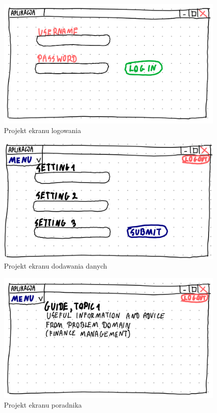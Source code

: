 \documentclass[a4paper,10pt, twoside]{report}
\begin{document}
\begin{large}
\begin{figure}[H]           %
    \centering
    \includegraphics[width=12cm]{figures/Righten_UI_sketch_loginscreen.png}
    \caption{Projekt ekranu logowania}
    \label{fig:uiprojectlogin}
\end{figure}

\begin{figure}[H]           %
    \centering
    \includegraphics[width=12cm]{figures/Righten_UI_sketch_settings.png}
    \caption{Projekt ekranu dodawania danych}
    \label{fig:uiprojectsettings}
\end{figure}

\begin{figure}[H]           %
    \centering
    \includegraphics[width=12cm]{figures/Righten_UI_sketch_guide.png}
    \caption{Projekt ekranu poradnika}
    \label{fig:uiprojectguide}
\end{figure}


\end{large}
\end{document}
